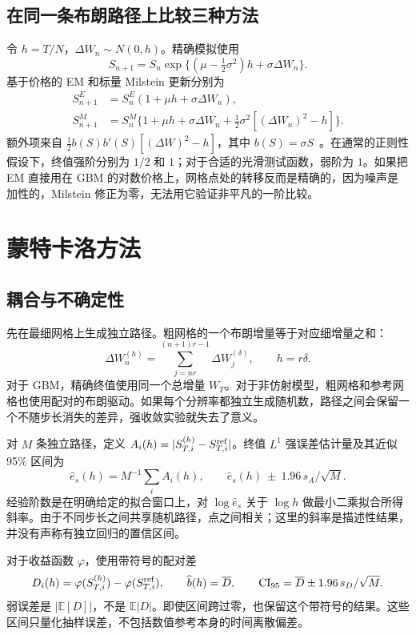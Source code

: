 \documentclass[11pt,a4paper,fontset=none]{ctexart}
\begin{document}
\subsection{在同一条布朗路径上比较三种方法}
令 $h=T/N$，$\Delta W_n\sim N(0,h)$。精确模拟使用
\begin{equation}
S_{n+1}=S_n\exp\{(\mu-\tfrac12\sigma^2)h+\sigma\Delta W_n\}.
\end{equation}
基于价格的 EM 和标量 Milstein 更新分别为
\begin{align}
S_{n+1}^{E}&=S_n^{E}(1+\mu h+\sigma\Delta W_n),\label{eq:em}\\
S_{n+1}^{M}&=S_n^{M}\{1+\mu h+\sigma\Delta W_n+
\tfrac12\sigma^2[(\Delta W_n)^2-h]\}.\label{eq:mil}
\end{align}
额外项来自 $\tfrac12 b(S)b'(S)[(\Delta W)^2-h]$，其中 $b(S)=\sigma S$~\cite{higham}。在通常的正则性假设下，终值强阶分别为 $1/2$ 和 $1$；对于合适的光滑测试函数，弱阶为 $1$。如果把 EM 直接用在 GBM 的对数价格上，网格点处的转移反而是精确的，因为噪声是加性的，Milstein 修正为零，无法用它验证非平凡的一阶比较。

\newpage
\section{蒙特卡洛方法}
\subsection{耦合与不确定性}
先在最细网格上生成独立路径。粗网格的一个布朗增量等于对应细增量之和：
\begin{equation}
\Delta W_n^{(h)}=\sum_{j=nr}^{(n+1)r-1}\Delta W_j^{(\delta)},
\qquad h=r\delta.
\label{eq:coupling}
\end{equation}
对于 GBM，精确终值使用同一个总增量 $W_T$。对于非仿射模型，粗网格和参考网格也使用配对的布朗驱动。如果每个分辨率都独立生成随机数，路径之间会保留一个不随步长消失的差异，强收敛实验就失去了意义。

对 $M$ 条独立路径，定义 $A_i(h)=|S_{T,i}^{(h)}-S_{T,i}^{\rm ref}|$。终值 $L^1$ 强误差估计量及其近似 95\% 区间为
\begin{equation}
\widehat e_s(h)=M^{-1}\sum_i A_i(h),\qquad
\widehat e_s(h)\ \pm\ 1.96\,s_A/\sqrt M.
\end{equation}
经验阶数是在明确给定的拟合窗口上，对 $\log\widehat e_s$ 关于 $\log h$ 做最小二乘拟合所得斜率。由于不同步长之间共享随机路径，点之间相关；这里的斜率是描述性结果，并没有声称有独立回归的置信区间。

对于收益函数 $\varphi$，使用带符号的配对差
\begin{equation}
D_i(h)=\varphi(S_{T,i}^{(h)})-\varphi(S_{T,i}^{\rm ref}),\qquad
\widehat b(h)=\overline D,\qquad
{\rm CI}_{95}=\overline D\pm1.96\,s_D/\sqrt M.
\end{equation}
弱误差是 $|\mathbb E[D]|$，不是 $\mathbb E|D|$。即使区间跨过零，也保留这个带符号的结果。这些区间只量化抽样误差，不包括数值参考本身的时间离散偏差。
\end{document}
